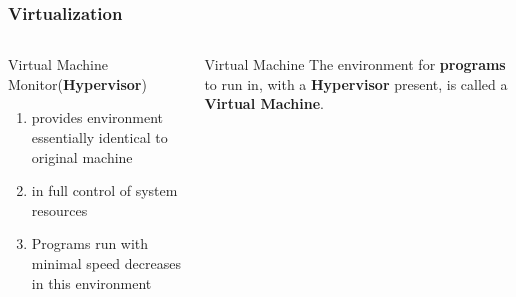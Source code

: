 \begin{frame}
	\frametitle{Virtualization}
	\begin{columns}
		\begin{block}{Virtual Machine Monitor\footnotemark[1] (\textbf{Hypervisor})}
			\begin{enumerate}
				\item provides environment essentially identical to original machine
				\item in full control of system resources
				\item Programs run with minimal speed decreases in this environment
			\end{enumerate}
		\end{block}
	
		\begin{block}{Virtual Machine\footnotemark[1]}
			The environment for \textbf{programs} to run in, with a \textbf{Hypervisor} present, is called a \textbf{Virtual Machine}.
		\end{block}
		
		\centering
	\end{columns}
	
\end{frame}

